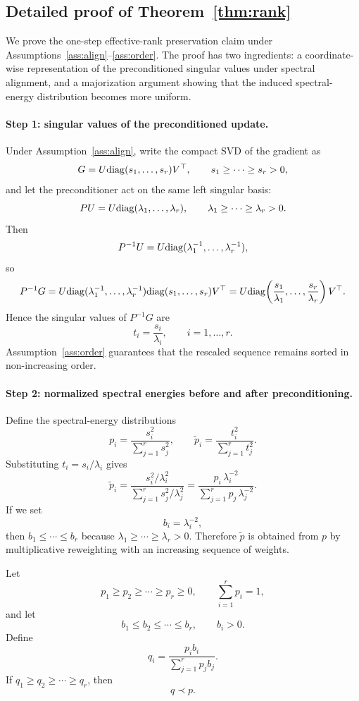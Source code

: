 \subsection{Detailed proof of Theorem~\ref{thm:rank}}
\label{app:proof_rank}

We prove the one-step effective-rank preservation claim under Assumptions~\ref{ass:align}--\ref{ass:order}. The proof has two ingredients: a coordinate-wise representation of the preconditioned singular values under spectral alignment, and a majorization argument showing that the induced spectral-energy distribution becomes more uniform.

\paragraph{Step 1: singular values of the preconditioned update.}
Under Assumption~\ref{ass:align}, write the compact SVD of the gradient as
\[
G = U \mathrm{diag}(s_1,\ldots,s_r) V^\top,
\qquad
s_1 \ge \cdots \ge s_r > 0,
\]
and let the preconditioner act on the same left singular basis:
\[
PU = U \mathrm{diag}(\lambda_1,\ldots,\lambda_r),
\qquad
\lambda_1 \ge \cdots \ge \lambda_r > 0.
\]
Then
\[
P^{-1}U = U \mathrm{diag}(\lambda_1^{-1},\ldots,\lambda_r^{-1}),
\]
so
\[
P^{-1}G
= U \mathrm{diag}(\lambda_1^{-1},\ldots,\lambda_r^{-1}) \mathrm{diag}(s_1,\ldots,s_r) V^\top
= U \mathrm{diag}\!\left(\frac{s_1}{\lambda_1},\ldots,\frac{s_r}{\lambda_r}\right) V^\top.
\]
Hence the singular values of $P^{-1}G$ are
\[
t_i = \frac{s_i}{\lambda_i}, \qquad i=1,\ldots,r.
\]
Assumption~\ref{ass:order} guarantees that the rescaled sequence remains sorted in non-increasing order.

\paragraph{Step 2: normalized spectral energies before and after preconditioning.}
Define the spectral-energy distributions
\[
p_i = \frac{s_i^2}{\sum_{j=1}^r s_j^2},
\qquad
\widetilde p_i = \frac{t_i^2}{\sum_{j=1}^r t_j^2}.
\]
Substituting $t_i = s_i/\lambda_i$ gives
\[
\widetilde p_i
= \frac{s_i^2/\lambda_i^2}{\sum_{j=1}^r s_j^2/\lambda_j^2}
= \frac{p_i\,\lambda_i^{-2}}{\sum_{j=1}^r p_j\,\lambda_j^{-2}}.
\]
If we set
\[
b_i = \lambda_i^{-2},
\]
then $b_1 \le \cdots \le b_r$ because $\lambda_1 \ge \cdots \ge \lambda_r > 0$. Therefore $\widetilde p$ is obtained from $p$ by multiplicative reweighting with an increasing sequence of weights.

\begin{lemma}
\label{lem:reweight_majorization_rank}
Let
\[
p_1 \ge p_2 \ge \cdots \ge p_r \ge 0,
\qquad
\sum_{i=1}^r p_i = 1,
\]
and let
\[
b_1 \le b_2 \le \cdots \le b_r,
\qquad
b_i > 0.
\]
Define
\[
q_i = \frac{p_i b_i}{\sum_{j=1}^r p_j b_j}.
\]
If $q_1 \ge q_2 \ge \cdots \ge q_r$, then
\[
q \prec p.
\]
\end{lemma}

